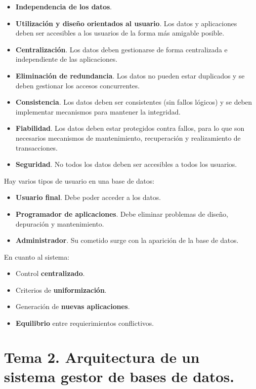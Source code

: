 \documentclass[12pt,spanish]{article}
\numberwithin{definition}{subsection}
\begin{document}
\begin{itemize}
	\item \textbf{Independencia de los datos}.
	\item \textbf{Utilización y diseño orientados al usuario}. Los datos y aplicaciones deben ser accesibles a los usuarios de la forma más amigable posible.
	\item \textbf{Centralización}. Los datos deben gestionarse de forma centralizada e independiente de las aplicaciones.
	\item \textbf{Eliminación de redundancia}. Los datos no pueden estar duplicados y se deben gestionar los accesos concurrentes.
	\item \textbf{Consistencia}. Los datos deben ser consistentes (sin fallos lógicos) y se deben implementar mecanismos para mantener la integridad.
	\item \textbf{Fiabilidad}. Los datos deben estar protegidos contra fallos, para lo que son necesarios mecanismos de mantenimiento, recuperación y realizamiento de transacciones.
	\item \textbf{Seguridad}. No todos los datos deben ser accesibles a todos los usuarios.
\end{itemize}

Hay varios tipos de usuario en una base de datos:

\begin{itemize}
	\item \textbf{Usuario final}. Debe poder acceder a los datos.
	\item \textbf{Programador de aplicaciones}. Debe eliminar problemas de diseño, depuración y mantenimiento.
	\item \textbf{Administrador}. Su cometido surge con la aparición de la base de datos.
\end{itemize}

En cuanto al sistema:

\begin{itemize}
	\item Control \textbf{centralizado}.
	\item Criterios de \textbf{uniformización}.
	\item Generación de \textbf{nuevas aplicaciones}.
	\item \textbf{Equilibrio} entre requierimientos conflictivos.
\end{itemize}

\section{Tema 2. Arquitectura de un sistema gestor de bases de datos.}
\end{document}

